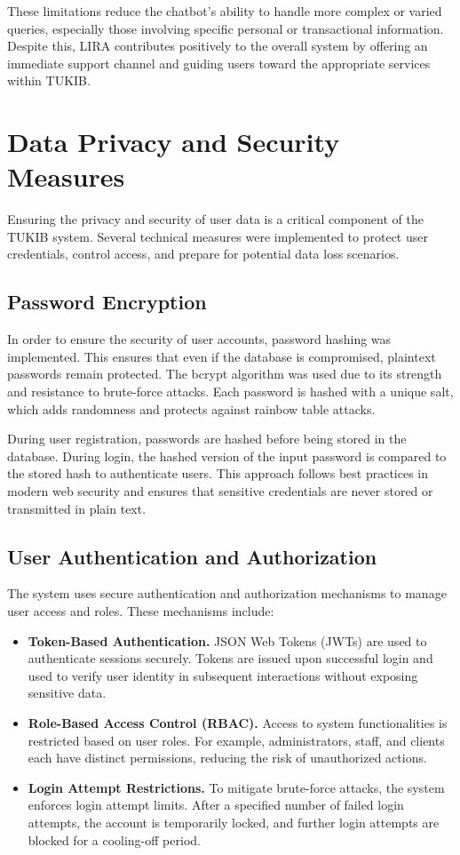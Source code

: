 These limitations reduce the chatbot’s ability to handle more complex or varied queries, especially those involving specific personal or transactional information. Despite this, LIRA contributes positively to the overall system by offering an immediate support channel and guiding users toward the appropriate services within TUKIB.

\section{Data Privacy and Security Measures}

Ensuring the privacy and security of user data is a critical component of the TUKIB system. Several technical measures were implemented to protect user credentials, control access, and prepare for potential data loss scenarios.

\subsection{Password Encryption}

In order to ensure the security of user accounts, password hashing was implemented. This ensures that even if the database is compromised, plaintext passwords remain protected. The bcrypt algorithm was used due to its strength and resistance to brute-force attacks. Each password is hashed with a unique salt, which adds randomness and protects against rainbow table attacks.

During user registration, passwords are hashed before being stored in the database. During login, the hashed version of the input password is compared to the stored hash to authenticate users. This approach follows best practices in modern web security and ensures that sensitive credentials are never stored or transmitted in plain text.

\subsection{User Authentication and Authorization}

The system uses secure authentication and authorization mechanisms to manage user access and roles. These mechanisms include:

\begin{itemize}
	\item \textbf{Token-Based Authentication.} JSON Web Tokens (JWTs) are used to authenticate sessions securely. Tokens are issued upon successful login and used to verify user identity in subsequent interactions without exposing sensitive data.
	\item \textbf{Role-Based Access Control (RBAC).} Access to system functionalities is restricted based on user roles. For example, administrators, staff, and clients each have distinct permissions, reducing the risk of unauthorized actions.
	\item \textbf{Login Attempt Restrictions.} To mitigate brute-force attacks, the system enforces login attempt limits. After a specified number of failed login attempts, the account is temporarily locked, and further login attempts are blocked for a cooling-off period.
\end{itemize}

